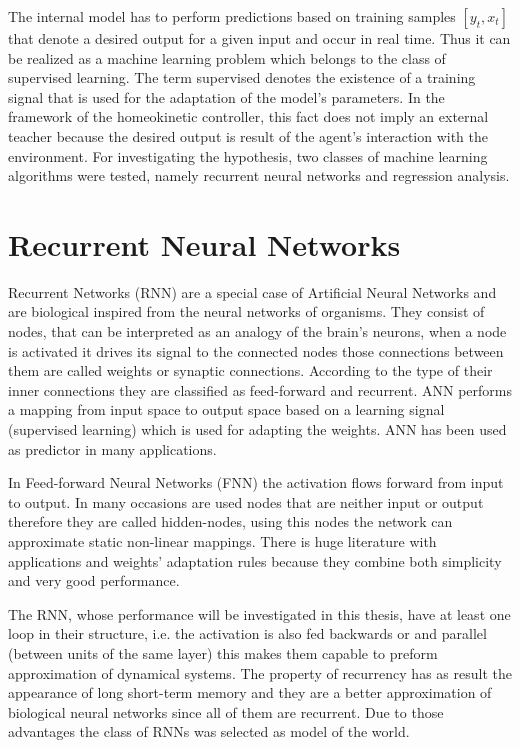 \documentclass[msc,ai,logo]{infthesis}
\begin{document}
The internal model has to perform predictions based on training samples $[y_t,x_t]$ that denote a desired output for a given input and occur in real time. Thus it can be realized as a machine learning problem which belongs to the class of supervised learning. The term supervised denotes the existence of a training signal that is used for the adaptation of the model's parameters. In the framework of the homeokinetic controller, this fact does not imply an external teacher because the desired output is result of the agent's interaction with the environment.
For investigating the hypothesis, two classes of machine learning algorithms were tested, namely recurrent neural networks and regression analysis.

\section{Recurrent Neural Networks}   
Recurrent Networks (RNN) are a special case of Artificial Neural Networks and are biological inspired from the neural networks of organisms. They consist of nodes, that can be interpreted as an analogy of the brain's neurons, when a node is activated it drives its signal to the connected nodes those connections between them are called weights or synaptic connections. According to the type of their inner connections they are classified as feed-forward and recurrent. ANN performs a mapping from input space to output space based on a learning signal (supervised learning) which is used for adapting the weights. ANN has been used as predictor in many applications. 

In Feed-forward Neural Networks (FNN) the activation flows forward from input to output. In many occasions are used nodes that are neither input or output therefore they are called hidden-nodes, using this nodes the network can approximate static non-linear mappings. There is huge literature with applications and weights' adaptation rules because they combine both simplicity and very good performance.

The RNN, whose performance will be investigated in this thesis, have at least one loop in their structure, i.e. the activation is also fed backwards or and parallel (between units of the same layer) this makes them capable to preform approximation of dynamical systems. The property of recurrency has as result the appearance of long short-term memory \cite{Hochreiter} and they are a better approximation of biological neural networks since all of them are recurrent. Due to those advantages the class of RNNs was selected as model of the world.
\end{document}

